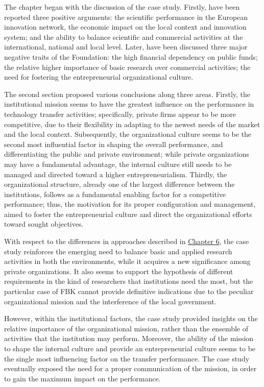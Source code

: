 The chapter began with the discussion of the case study. Firstly, have been reported three positive arguments: the scientific performance in the European innovation network, the economic impact on the local context and innovation system; and the ability to balance scientific and commercial activities at the international, national and local level. Later, have been discussed three major negative traits of the Foundation: the high financial dependency on public funds; the relative higher importance of basic research over commercial activities; the need for fostering the entrepreneurial organizational culture. 

The second section proposed various conclusions along three areas. Firstly, the institutional mission seems to have the greatest influence on the performance in technology transfer activities; specifically, private firms appear to be more competitive, due to their flexibility in adapting to the newest needs of the market and the local context. Subsequently, the organizational culture seems to be the second most influential factor in shaping the overall performance, and differentiating the public and private environment; while private organizations may have a fundamental advantage, the internal culture still needs to be managed and directed toward a higher entrepreneurialism. Thirdly, the organizational structure, already one of the largest difference between the institutions, follows as a fundamental enabling factor for a competitive performance; thus, the motivation for its proper configuration and management, aimed to foster the entrepreneurial culture and direct the organizational efforts toward sought objectives.

With respect to the differences in approaches described in \hyperref[Chapter6]{Chapter 6}, the case study reinforces the emerging need to balance basic and applied research activities in both the environments, while it acquires a new significance among private organizations. It also seems to support the hypothesis of different requirements in the kind of researchers that institutions need the most, but the particular case of FBK cannot provide definitive indications due to the peculiar organizational mission and the interference of the local government.

However, within the institutional factors, the case study provided insights on the relative importance of the organizational mission, rather than the ensemble of activities that the institution may perform. Moreover, the ability of the mission to shape the internal culture and provide an entrepreneurial culture seems to be the single most influencing factor on the transfer performance. The case study eventually exposed the need for a proper communication of the mission, in order to gain the maximum impact on the performance. 

